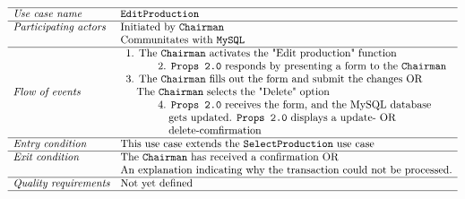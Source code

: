 \documentclass[12pt]{article}
\begin{document}
\\\\
\[
\begin{array}{ll}
\hline
\textit{Use case name} & \texttt{EditProduction} \\
\hline
\textit{Participating actors} & \text{Initiated by \texttt{Chairman}} \\
& \text{Communitates with \texttt{MySQL}} \\
\hline
\textit{Flow of events} & 
\begin{array}{l}
\text{1. The \texttt{Chairman} activates the "Edit production" function} \\
\quad \quad \quad \text{2. \texttt{Props 2.0} responds by presenting a form to the \texttt{Chairman}}\\
\text{3. The \texttt{Chairman} fills out the form and submit the changes OR} \\ \quad \text{The \texttt{Chairman} selects the "Delete" option} \\
\quad \quad \quad \text{4. \texttt{Props 2.0} receives the form, and the MySQL database} \\ \quad \quad \quad \quad \text{gets updated. \texttt{Props 2.0} displays a update- OR}\\\quad \quad \quad \quad \text{delete-comfirmation} 
\end{array} \\
\hline
\textit{Entry condition} & \text{This use case extends the  \texttt{SelectProduction} use case} \\
\hline
\textit{Exit condition} & \text{The \texttt{Chairman} has received a confirmation OR} \\ & \text{An explanation indicating why the transaction could not be processed.} \\
\hline
\textit{Quality requirements} & \text{Not yet defined} \\
\hline
\end{array}
\]
\\\\
\end{document}
